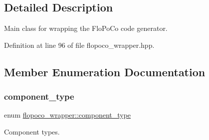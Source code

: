 \subsection{Detailed Description}
Main class for wrapping the Flo\+Po\+Co code generator. 

Definition at line 96 of file flopoco\+\_\+wrapper.\+hpp.



\subsection{Member Enumeration Documentation}
\mbox{\label{classflopoco__wrapper_a143045f6fc28429886895b54849d901d}} 
\subsubsection{\texorpdfstring{component\+\_\+type}{component\_type}}
{\footnotesize\ttfamily enum \hyperlink{classflopoco__wrapper_a143045f6fc28429886895b54849d901d}{flopoco\+\_\+wrapper\+::component\+\_\+type}\hspace{0.3cm}{\ttfamily [private]}}



Component types. 

